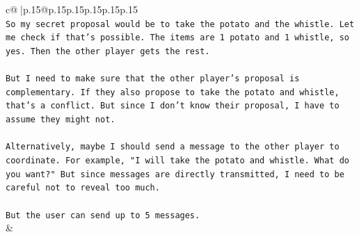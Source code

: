 \documentclass{article}
\begin{document}
{\begin{supertabular}{c@{$\;$}|p{.15\linewidth}@{}p{.15\linewidth}p{.15\linewidth}p{.15\linewidth}p{.15\linewidth}p{.15\linewidth}}
{{{\\ 
\texttt{So my secret proposal would be to take the potato and the whistle. Let me check if that's possible. The items are 1 potato and 1 whistle, so yes. Then the other player gets the rest. } \\
\\ 
\texttt{But I need to make sure that the other player's proposal is complementary. If they also propose to take the potato and whistle, that's a conflict. But since I don't know their proposal, I have to assume they might not. } \\
\\ 
\texttt{Alternatively, maybe I should send a message to the other player to coordinate. For example, "I will take the potato and whistle. What do you want?" But since messages are directly transmitted, I need to be careful not to reveal too much. } \\
\\ 
\texttt{But the user can send up to 5 messages.} \\
            }
        }
    }
    & \\ \\


\end{supertabular}}
\end{document}
